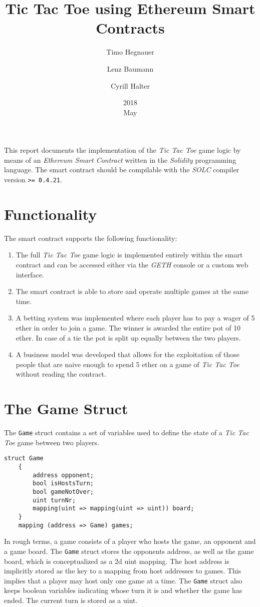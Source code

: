 \documentclass[10pt]{article}
\title{Tic Tac Toe using Ethereum Smart Contracts}
\date{2018\\ May}
\author{Timo Hegnauer
\and Lenz Baumann
\and Cyrill Halter}
\begin{document}
\maketitle
This report documents the implementation of the \emph{Tic Tac Toe} game logic by means of an \emph{Ethereum Smart Contract} written in the \emph{Solidity} programming language. The smart contract should be compilable with the \emph{SOLC} compiler version \texttt{>= 0.4.21}.

\section{Functionality}
The smart contract supports the following functionality:
\begin{enumerate}
	\item The full \emph{Tic Tac Toe} game logic is implemented entirely within the smart contract and can be accessed either via the \emph{GETH} console or a custom web interface.
	\item The smart contract is able to store and operate multiple games at the same time.
	\item A betting system was implemented where each player has to pay a wager of 5 ether in order to join a game. The winner is awarded the entire pot of 10 ether. In case of a tie the pot is split up equally between the two players.
	\item A business model was developed that allows for the exploitation of those people that are naive enough to spend 5 ether on a game of \emph{Tic Tac Toe} without reading the contract.
\end{enumerate}

\section{The Game Struct}

The \texttt{Game} struct contains a set of variables used to define the state of a \emph{Tic Tac Toe} game between two players.

\begin{Verbatim}[fontsize=\small]
    struct Game
    {
        address opponent;
        bool isHostsTurn;
        bool gameNotOver;
        uint turnNr;
        mapping(uint => mapping(uint => uint)) board;
    }
    mapping (address => Game) games;
\end{Verbatim}

In rough terms, a game consists of a player who hosts the game, an opponent and a game board. The \texttt{Game} struct stores the opponents address, as well as the game board, which is conceptualized as a 2d uint mapping. The host address is implicitly stored as the key to a mapping from host addresses to games. This implies that a player may host only one game at a time. The \texttt{Game} struct also keeps boolean variables indicating whose turn it is and whether the	 game has ended. The current turn is stored as a uint.
\end{document}
